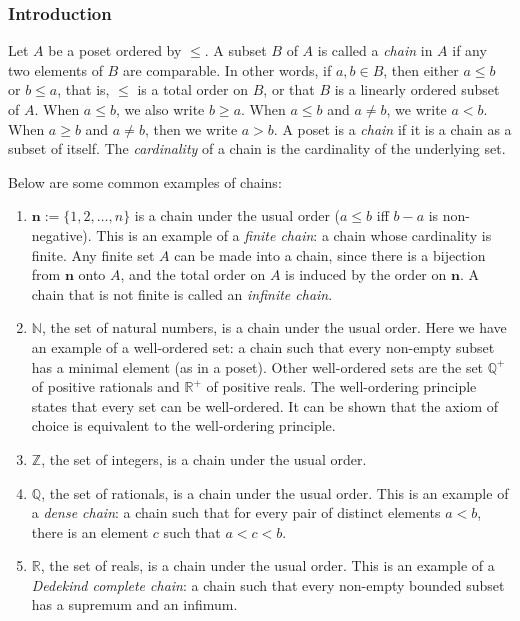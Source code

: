 \documentclass[12pt]{article}
\begin{document}
\subsubsection*{Introduction}

Let $A$ be a poset ordered by $\le$.  A subset $B$ of $A$ is called a \emph{chain} in $A$ if any two elements of $B$ are comparable.  In other words, if $a,b\in B$, then either $a\le b$ or $b\le a$, that is, $\le$ is a total order on $B$, or that $B$ is a linearly ordered subset of $A$.  When $a\le b$, we also write $b\ge a$.  When $a\le b$ and $a\ne b$, we write $a<b$.  When $a\ge b$ and $a\ne b$, then we write $a>b$.  A poset is a \emph{chain} if it is a chain as a subset of itself.  The \emph{cardinality} of a chain is the cardinality of the underlying set.

Below are some common examples of chains:
\begin{enumerate}
\item $\mathbf{n}:=\lbrace 1, 2, \ldots, n\rbrace$ is a chain under the usual order ($a\le b$ iff $b-a$ is non-negative).  This is an example of a \emph{finite chain}: a chain whose cardinality is finite.  Any finite set $A$ can be made into a chain, since there is a bijection from $\mathbf{n}$ onto $A$, and the total order on $A$ is induced by the order on $\mathbf{n}$.  A chain that is not finite is called an \emph{infinite chain}.
\item $\mathbb{N}$, the set of natural numbers, is a chain under the usual order.  Here we have an example of a well-ordered set: a chain such that every non-empty subset has a minimal element (as in a poset).  Other well-ordered sets are the set $\mathbb{Q}^{+}$ of positive rationals and $\mathbb{R}^{+}$ of positive reals.  The well-ordering principle states that every set can be well-ordered.  It can be shown that the axiom of choice is equivalent to the well-ordering principle.
\item $\mathbb{Z}$, the set of integers, is a chain under the usual order.
\item $\mathbb{Q}$, the set of rationals, is a chain under the usual order.  This is an example of a \emph{dense chain}: a chain such that for every pair of distinct elements $a<b$, there is an element $c$ such that $a<c<b$.
\item $\mathbb{R}$, the set of reals, is a chain under the usual order.  This is an example of a \emph{Dedekind complete chain}: a chain such that every non-empty bounded subset has a supremum and an infimum.
\end{enumerate}
\end{document}
